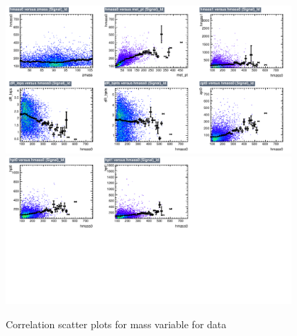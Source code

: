 \begin{figure}[!htb]%
\centering
\includegraphics[width=0.95\textwidth]{figures/CRDY/dataset/plots/correlationscatter_hmass0__Id_c1.pdf}
\includegraphics[width=0.95\textwidth]{figures/CRDY/dataset/plots/correlationscatter_hmass0__Id_c2.pdf}
\caption{ Correlation scatter plots for \HZZ mass  variable for data}%
\label{fig:correlations_CRDY_hmass0_S}                                                       
\end{figure}



